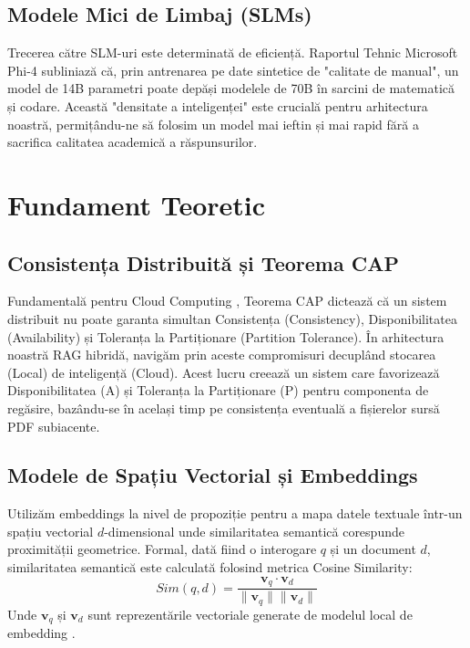 \documentclass[conference]{IEEEtran}
\begin{document}
\subsection{Modele Mici de Limbaj (SLMs)}
Trecerea către SLM-uri este determinată de eficiență. Raportul Tehnic Microsoft Phi-4 \cite{phi4_report} subliniază că, prin antrenarea pe date sintetice de "calitate de manual", un model de 14B parametri poate depăși modelele de 70B în sarcini de matematică și codare. Această "densitate a inteligenței" este crucială pentru arhitectura noastră, permițându-ne să folosim un model mai ieftin și mai rapid fără a sacrifica calitatea academică a răspunsurilor.

\section{Fundament Teoretic}

\subsection{Consistența Distribuită și Teorema CAP}
Fundamentală pentru Cloud Computing \cite{curs1}, Teorema CAP dictează că un sistem distribuit nu poate garanta simultan Consistența (Consistency), Disponibilitatea (Availability) și Toleranța la Partiționare (Partition Tolerance). În arhitectura noastră RAG hibridă, navigăm prin aceste compromisuri decuplând stocarea (Local) de inteligență (Cloud). Acest lucru creează un sistem care favorizează Disponibilitatea (A) și Toleranța la Partiționare (P) pentru componenta de regăsire, bazându-se în același timp pe consistența eventuală a fișierelor sursă PDF subiacente.

\subsection{Modele de Spațiu Vectorial și Embeddings}
Utilizăm embeddings la nivel de propoziție pentru a mapa datele textuale într-un spațiu vectorial $d$-dimensional unde similaritatea semantică corespunde proximității geometrice. Formal, dată fiind o interogare $q$ și un document $d$, similaritatea semantică este calculată folosind metrica Cosine Similarity:
\begin{equation}
Sim(q, d) = \frac{\mathbf{v}_q \cdot \mathbf{v}_d}{\|\mathbf{v}_q\| \|\mathbf{v}_d\|}
\end{equation}
Unde $\mathbf{v}_q$ și $\mathbf{v}_d$ sunt reprezentările vectoriale generate de modelul local de embedding \cite{curs5}.
\end{document}
